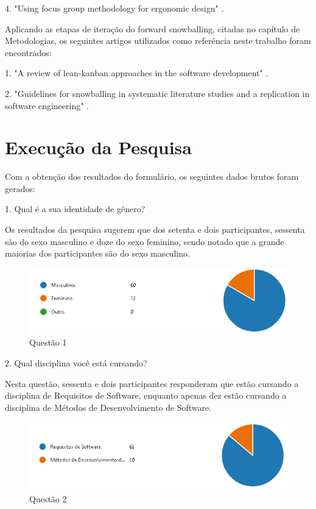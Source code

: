4. "Using focus group methodology for ergonomic design" \cite{caplan1990using}.

Aplicando as etapas de iteração do forward snowballing, citadas no capítulo de Metodologias, os seguintes artigos utilizados como referência neste trabalho foram encontrados:

1. "A review of lean-kanban approaches in the software development" \cite{corona2013review}.

2. "Guidelines for snowballing in systematic literature studies and a replication in software engineering" \cite{wohlin2014guidelines}.

\section{Execução da Pesquisa}

Com a obtenção dos resultados do formulário, os seguintes dados brutos foram gerados:

1. Qual é a sua identidade de gênero?

Os resultados da pesquisa sugerem que dos setenta e dois participantes, sessenta são do sexo masculino e doze do sexo feminino, sendo notado que a grande maiorias dos participantes são do sexo masculino.

\begin{figure}[H]
\centering
\includegraphics[scale=0.6]{figuras/1.png}
\caption{Questão 1}
\end{figure}

2. Qual disciplina você está cursando?

Nesta questão, sessenta e dois participantes responderam que estão cursando a disciplina de Requisitos de Software, enquanto apenas dez estão cursando a disciplina de Métodos de Desenvolvimento de Software.

\begin{figure}[H]
\centering
\includegraphics[scale=0.6]{figuras/2.png}
\caption{Questão 2}
\end{figure}


